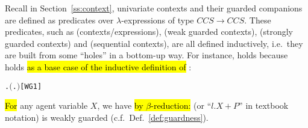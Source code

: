 Recall in Section~\ref{ss:context}, univariate contexts and their
guarded companions are defined as predicates over $\lambda$-expressions
of type $CCS\rightarrow CCS$. These predicates, such as
(contexts/expressions),  (weak guarded contexts),
 (strongly guarded contexts) and  (sequential
contexts), are all defined inductively, i.e.~they are built from some ``holes''
in a bottom-up way. For instance, 
holds because 
holds \hl{as a base case of the inductive definition of} :
\begin{alltt}
\HOLTokenTurnstile{} \HOLSymConst{\HOLTokenForall{}}.  \ensuremath{(}\HOLTokenLambda{}. \HOLSymConst{\ensuremath{\ldotp}}\ensuremath{)}\hfill{[WG1]}
\end{alltt}
\hl{For} any agent variable $X$, we have \hl{by $\beta$-reduction:}
 (or ``$l.X + P$'' in textbook
notation) is weakly guarded (c.f.~Def.~\ref{def:guardness}).

